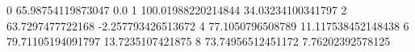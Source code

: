 0 65.98754119873047 0.0
1 100.01988220214844 34.03234100341797
2 63.7297477722168 -2.257793426513672
4 77.1050796508789 11.117538452148438
6 79.71105194091797 13.7235107421875
8 73.74956512451172 7.76202392578125
